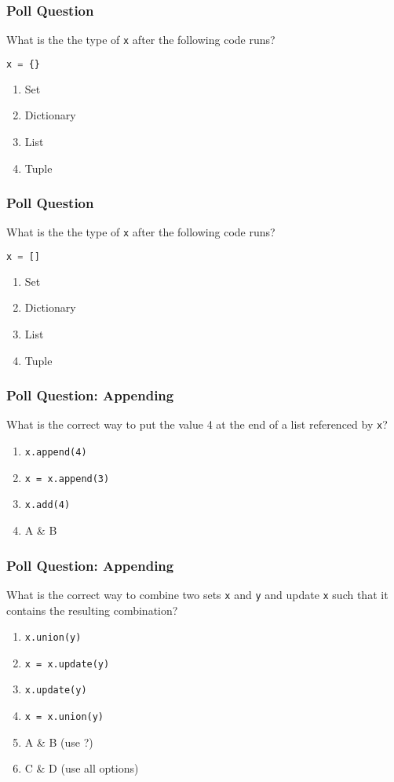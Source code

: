 \documentclass{beamer}
\begin{document}
%
%
\begin{frame}[fragile]
  \frametitle{Poll Question}
  What is the the type of \lstinline|x| after the following code runs?
  \begin{lstlisting}[language=Python, autogobble]
  x = {}
  \end{lstlisting}
  \vfill
  \begin{enumerate}[A] 
    \item Set
    \item Dictionary
    \item List
    \item Tuple
  \end{enumerate}
\end{frame}


%
%
\begin{frame}[fragile]
  \frametitle{Poll Question}
  What is the the type of \lstinline|x| after the following code runs?
  \begin{lstlisting}[language=Python, autogobble]
  x = []
  \end{lstlisting}
  \vfill
  \begin{enumerate}[A] 
    \item Set
    \item Dictionary
    \item List
    \item Tuple
  \end{enumerate}
\end{frame}

%
%
\begin{frame}[fragile]
  \frametitle{Poll Question: Appending}
  What is the correct way to put the value 4 at the end of a list referenced by \lstinline|x|?
  \vfill
  \begin{enumerate}[A] 
    \item \lstinline|x.append(4)|
    \item \lstinline|x = x.append(3)|
    \item \lstinline|x.add(4)| 
    \item A \& B
  \end{enumerate}
\end{frame}

%
%
\begin{frame}[fragile]
  \frametitle{Poll Question: Appending}
  What is the correct way to combine two sets \lstinline|x| and \lstinline|y| and update \lstinline|x| such that it contains the resulting combination?
  \vfill
  \begin{enumerate}[A] 
    \item \lstinline|x.union(y)|
    \item \lstinline|x = x.update(y)|
    \item \lstinline|x.update(y)| 
    \item \lstinline|x = x.union(y)|
    \item A \& B (use ?)
    \item C \& D (use all options)
  \end{enumerate}
\end{frame}
\end{document}
